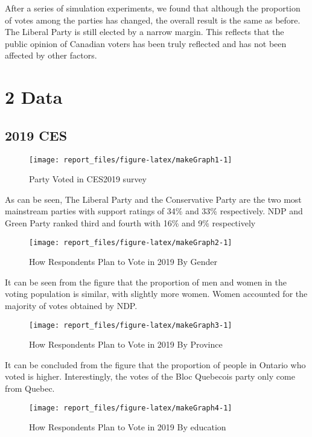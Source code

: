 \documentclass[
  12pt,
]{article}
\begin{document}
After a series of simulation experiments, we found that although the
proportion of votes among the parties has changed, the overall result is
the same as before. The Liberal Party is still elected by a narrow
margin. This reflects that the public opinion of Canadian voters has
been truly reflected and has not been affected by other factors.

\hypertarget{data}{%
\section{2 Data}\label{data}}

\hypertarget{ces}{%
\subsection{2019 CES}\label{ces}}

\begin{figure}
\texttt{[image: report\_files/figure-latex/makeGraph1-1]} \caption{Party Voted in CES2019 survey}\label{fig:makeGraph1}
\end{figure}

As can be seen, The Liberal Party and the Conservative Party are the two
most mainstream parties with support ratings of 34\% and 33\%
respectively. NDP and Green Party ranked third and fourth with 16\% and
9\% respectively

\begin{figure}
\texttt{[image: report\_files/figure-latex/makeGraph2-1]} \caption{How Respondents Plan to Vote in 2019 By Gender}\label{fig:makeGraph2}
\end{figure}

It can be seen from the figure that the proportion of men and women in
the voting population is similar, with slightly more women. Women
accounted for the majority of votes obtained by NDP.

\begin{figure}
\texttt{[image: report\_files/figure-latex/makeGraph3-1]} \caption{How Respondents Plan to Vote in 2019 By Province}\label{fig:makeGraph3}
\end{figure}

It can be concluded from the figure that the proportion of people in
Ontario who voted is higher. Interestingly, the votes of the Bloc
Quebecois party only come from Quebec.

\begin{figure}
\texttt{[image: report\_files/figure-latex/makeGraph4-1]} \caption{How Respondents Plan to Vote in 2019 By education}\label{fig:makeGraph4}
\end{figure}
\end{document}
